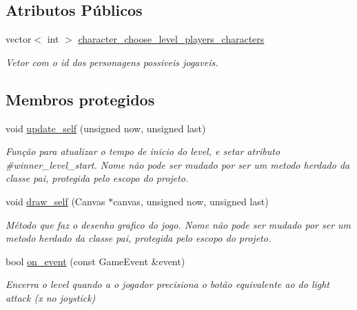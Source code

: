 \subsection*{Atributos Públicos}
\begin{DoxyCompactItemize}
\item 
\mbox{\label{classCharacterChooseLevel_a971370beafa7380fd2472f699ff6e40f}} 
vector$<$ int $>$ \mbox{\hyperlink{classCharacterChooseLevel_a971370beafa7380fd2472f699ff6e40f}{character\+\_\+choose\+\_\+level\+\_\+players\+\_\+characters}}
\begin{DoxyCompactList}\small\item\em Vetor com o id dos personagens possiveis jogaveis. \end{DoxyCompactList}\end{DoxyCompactItemize}
\subsection*{Membros protegidos}
\begin{DoxyCompactItemize}
\item 
void \mbox{\hyperlink{classCharacterChooseLevel_a28a65c50ef528b2fb2d12ebef93e7426}{update\+\_\+self}} (unsigned now, unsigned last)
\begin{DoxyCompactList}\small\item\em Função para atualizar o tempo de inicio do level, e setar atributo \#winner\+\_\+level\+\_\+start. Nome não pode ser mudado por ser um metodo herdado da classe pai, protegida pelo escopo do projeto. \end{DoxyCompactList}\item 
void \mbox{\hyperlink{classCharacterChooseLevel_ac124d3fb4690e5b369a95f49758592ca}{draw\+\_\+self}} (Canvas $\ast$canvas, unsigned now, unsigned last)
\begin{DoxyCompactList}\small\item\em Método que faz o desenho grafico do jogo. Nome não pode ser mudado por ser um metodo herdado da classe pai, protegida pelo escopo do projeto. \end{DoxyCompactList}\item 
bool \mbox{\hyperlink{classCharacterChooseLevel_a2fb500ba943a4f22ed01be915b59452a}{on\+\_\+event}} (const Game\+Event \&event)
\begin{DoxyCompactList}\small\item\em Encerra o level quando a o jogador precisiona o botão equivalente ao do light attack (x no joystick) \end{DoxyCompactList}\end{DoxyCompactItemize}
